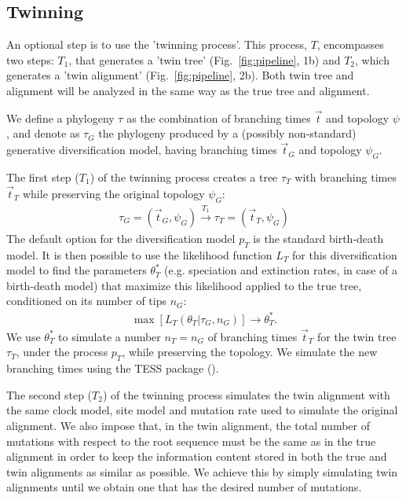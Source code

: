 \subsection{Twinning}\label{subsec:twinning}

An optional step is to use the 'twinning process'.
This process, $T$, encompasses two steps:
$T_1$, that generates a 'twin tree' (Fig.~\ref{fig:pipeline}, 1b) 
and $T_2$, which generates a 'twin alignment' (Fig.~\ref{fig:pipeline}, 2b).
Both twin tree and alignment will be analyzed in the same way 
as the true tree and alignment.

We define a phylogeny $\tau$ as the combination of
branching times $\Vec{t}$ and topology $\psi$, 
and denote as $\tau_{\mathit{G}}$ the phylogeny 
produced by a (possibly non-standard) generative diversification model, 
having branching times $\Vec{t}_{\mathit{G}}$ and 
topology $\psi_{\mathit{G}}$.

The first step ($T_1$) of the twinning process creates a tree $\tau_{\mathit{T}}$
with branching times $\Vec{t}_{\mathit{T}}$ while preserving the original
topology $\psi_{\mathit{G}}$:
\begin{align}
  \tau_{\mathit{G}} = (\Vec{t}_{\mathit{G}}, \psi_{\mathit{G}}) 
  \xrightarrow[]{\mathit{T_1}} 
  \tau_{\mathit{T}} = (\Vec{t}_{\mathit{T}}, \psi_{\mathit{G}})
\end{align}
The default option for the diversification model $p_T$ is the standard birth-death model.
It is then possible to use the likelihood function 
$L_{\mathit{T}}$ for this diversification model to find the parameters $\theta^{*}_{\mathit{T}}$ 
(e.g. speciation and extinction rates, in case of a birth-death model) 
that maximize this likelihood applied 
to the true tree, conditioned on its number of tips $n_{\mathit{G}}$:
\begin{align}
    \max[L_{\mathit{T}}(\theta_{\mathit{T}}|\tau_{\mathit{G}}, n_{\mathit{G}})] 
\rightarrow \theta^{*}_{\mathit{T}}.
\end{align}
We use $\theta^{*}_{\mathit{T}}$ to simulate a number 
$n_{\mathit{T}} = n_{\mathit{G}}$ 
of branching times $\Vec{t}_{\mathit{T}}$ for the twin tree 
$\tau_{\mathit{T}}$, under the process $p_{T}$, 
while preserving the topology. We simulate the new branching times using the TESS package (\cite{TESS, hohna2016tess}).

The second step ($T_2$) of the twinning process simulates the twin alignment 
with the same clock model, site model and mutation rate 
used to simulate the original alignment. 
We also impose that, in the twin alignment, 
the total number of mutations with respect to the root sequence 
must be the same as in the true alignment in order to keep the information content 
stored in both the true and twin alignments as similar as possible. We achieve this by simply simulating twin alignments until we
obtain one that has the desired number of mutations.

